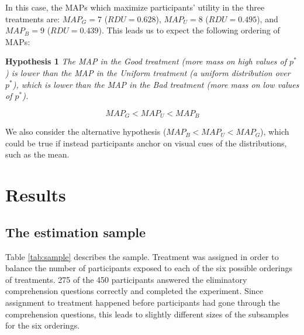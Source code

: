 In this case, the MAPs which maximize participants' utility in the three treatments are: $MAP_G = 7$ ($RDU = 0.628$), $MAP_U = 8$ ($RDU = 0.495$), and $MAP_B = 9$ ($RDU = 0.439$).
This leads us to expect the following ordering of MAPs:

\noindent \textbf{Hypothesis 1} \quad \textit{The MAP in the Good treatment (more mass on high values of $p^*$) is lower than the MAP in the Uniform treatment (a uniform distribution over $p^*$), which is lower than the MAP in the Bad treatment (more mass on low values of $p^*$).}

\begin{equation}
MAP_G < MAP_U < MAP_B
\end{equation}

We also consider the alternative hypothesis ($MAP_B < MAP_U < MAP_G$), which could be true if instead participants anchor on visual cues of the distributions, such as the mean.

\section{Results}\label{sec:results}
\subsection{The estimation sample}\label{ssec:sample}

Table \ref{tab:sample} describes the sample.
Treatment was assigned in order to balance the number of participants exposed to each of the six possible orderings of treatments.
275 of the 450 participants answered the eliminatory comprehension questions correctly and completed the experiment.
Since assignment to treatment happened before participants had gone through the comprehension questions, this leads to slightly different sizes of the subsamples for the six orderings.

